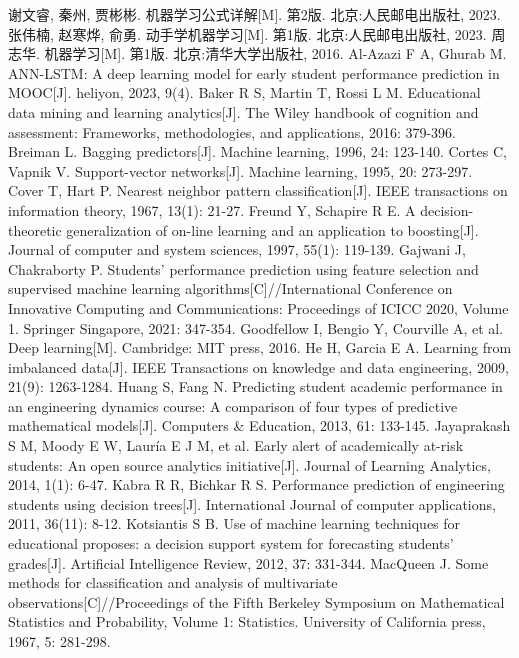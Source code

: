 \documentclass[a4paper, utf8]{ctexart}
\begin{document}
	\begin{thebibliography}{99}
		 谢文睿, 秦州, 贾彬彬. 机器学习公式详解[M]. 第2版. 北京:人民邮电出版社, 2023.
		 张伟楠, 赵寒烨, 俞勇. 动手学机器学习[M]. 第1版. 北京:人民邮电出版社, 2023.
		 周志华. 机器学习[M]. 第1版. 北京:清华大学出版社, 2016.
		 Al-Azazi F A, Ghurab M. ANN-LSTM: A deep learning model for early student performance prediction in MOOC[J]. heliyon, 2023, 9(4).
		 Baker R S, Martin T, Rossi L M. Educational data mining and learning analytics[J]. The Wiley handbook of cognition and assessment: Frameworks, methodologies, and applications, 2016: 379-396.
		 Breiman L. Bagging predictors[J]. Machine learning, 1996, 24: 123-140.
		 Cortes C, Vapnik V. Support-vector networks[J]. Machine learning, 1995, 20: 273-297.
		 Cover T, Hart P. Nearest neighbor pattern classification[J]. IEEE transactions on information theory, 1967, 13(1): 21-27.
		 Freund Y, Schapire R E. A decision-theoretic generalization of on-line learning and an application to boosting[J]. Journal of computer and system sciences, 1997, 55(1): 119-139.
		 Gajwani J, Chakraborty P. Students’ performance prediction using feature selection and supervised machine learning algorithms[C]//International Conference on Innovative Computing and Communications: Proceedings of ICICC 2020, Volume 1. Springer Singapore, 2021: 347-354.
		 Goodfellow I, Bengio Y, Courville A, et al. Deep learning[M]. Cambridge: MIT press, 2016.
		 He H, Garcia E A. Learning from imbalanced data[J]. IEEE Transactions on knowledge and data engineering, 2009, 21(9): 1263-1284.
		 Huang S, Fang N. Predicting student academic performance in an engineering dynamics course: A comparison of four types of predictive mathematical models[J]. Computers \& Education, 2013, 61: 133-145.
		 Jayaprakash S M, Moody E W, Lauría E J M, et al. Early alert of academically at-risk students: An open source analytics initiative[J]. Journal of Learning Analytics, 2014, 1(1): 6-47.
		 Kabra R R, Bichkar R S. Performance prediction of engineering students using decision trees[J]. International Journal of computer applications, 2011, 36(11): 8-12.
		 Kotsiantis S B. Use of machine learning techniques for educational proposes: a decision support system for forecasting students’ grades[J]. Artificial Intelligence Review, 2012, 37: 331-344.
		 MacQueen J. Some methods for classification and analysis of multivariate observations[C]//Proceedings of the Fifth Berkeley Symposium on Mathematical Statistics and Probability, Volume 1: Statistics. University of California press, 1967, 5: 281-298.

\end{thebibliography}
\end{document}
